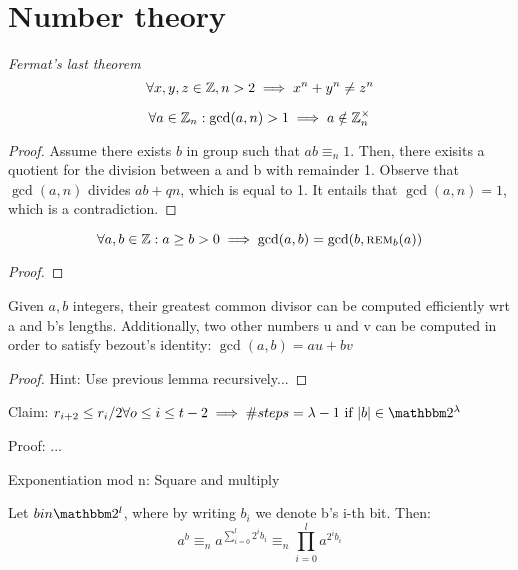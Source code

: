 
\section{Number theory}

\begin{theorem} \emph{Fermat's last theorem}
    \[
        \forall x, y, z \in \mathbb{Z}, n > 2 \implies x^n + y^n \neq z^n
    \]
\end{theorem}

\begin{lemma}
    \[
        \forall a \in \mathbb{Z}_n : \gcd(a, n) > 1 \implies a \notin \mathbb{Z}_n^\times
    \]
\end{lemma}

\begin{proof}
    Assume there exists $b$ in group such that $ab \equiv_n 1$. Then, there exisits a quotient for the division between a and b with remainder 1. Observe that $\gcd(a, n)$ divides $ab + qn$, which is equal to 1. It entails that $\gcd(a, n) = 1$, which is a contradiction.
\end{proof}

\begin{lemma}
    \[
        \forall a, b \in \mathbb{Z} : a \geq b > 0 \implies \gcd(a, b) = \gcd(b, \textsc{rem}_b(a))
    \]
\end{lemma}

\begin{proof}
    
\end{proof}

\begin{theorem}
    Given $a, b$ integers, their greatest common divisor can be computed efficiently wrt a and b's lengths. Additionally, two other numbers u and v can be computed in order to satisfy bezout's identity: $\gcd(a, b) = au + bv$
\end{theorem}

\begin{proof}
    Hint: Use previous lemma recursively...
\end{proof}

Claim: $r_{i+2} \leq r_i/2 \forall o \leq i \leq t-2 \implies \#steps = \lambda - 1 \text{ if } |b| \in \binary^\lambda$

Proof: ...


\begin{definition}
    Exponentiation mod n: Square and multiply

    Let $b in \binary^l$, where by writing $b_i$ we denote b's i-th bit. Then:
    \[
        a^b \equiv_n a^{\sum_{i=0}^l 2^ib_i} \equiv_n \prod_{i=0}^l a^{2^ib_i} 
    \]
\end{definition}

